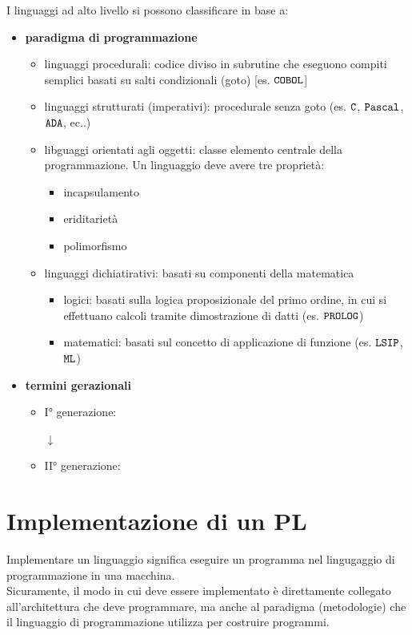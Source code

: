 I linguaggi ad alto livello si possono classificare in base a:
\begin{itemize}[label=$\circ$, itemsep=\medskipamount]
    \item \textbf{paradigma di programmazione}
    \begin{itemize}[itemsep=\smallskipamount]
        \item linguaggi procedurali: codice diviso in subrutine che eseguono compiti semplici basati su salti condizionali (goto) [es. $\verb|COBOL|$]
        \item linguaggi strutturati (imperativi): procedurale senza goto (es. $\verb|C|$, $\verb|Pascal|$, $\verb|ADA|$, ec..)
        \item libguaggi orientati agli oggetti: classe elemento centrale della programmazione.
        Un linguaggio deve avere tre proprietà:
        \begin{itemize}[itemsep=\smallskipamount]
            \item incapsulamento
            \item eriditarietà
            \item polimorfismo
        \end{itemize}
        \item linguaggi dichiatirativi: basati su componenti della matematica
        \begin{itemize}[itemsep=\smallskipamount]
            \item logici: basati sulla logica proposizionale del primo ordine, in cui si effettuano calcoli tramite dimostrazione di datti (es. $\verb|PROLOG|$)
            \item matematici: basati sul concetto di applicazione di funzione (es. $\verb|LSIP|$, $\verb|ML|$)
        \end{itemize}
    \end{itemize}
    \item \textbf{termini gerazionali}
    \begin{itemize}[itemsep=\smallskipamount]
        \item I° generazione:
        \begin{center}
            $\downarrow$
        \end{center}
        \item II° generazione:
    \end{itemize}
\end{itemize}

\section{Implementazione di un PL}
Implementare un linguaggio significa eseguire un programma nel lingugaggio di programmazione in una macchina.\\[0.2ex]
Sicuramente, il modo in cui deve essere implementato è direttamente collegato all'architettura che deve programmare, ma anche al paradigma (metodologie) che il linguaggio di programmazione utilizza per costruire programmi.

